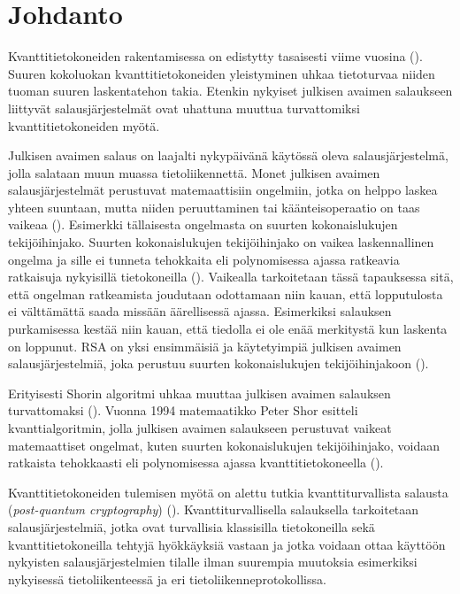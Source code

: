 \chapter{Johdanto\label{intro}}
Kvanttitietokoneiden rakentamisessa on edistytty tasaisesti viime vuosina (\cite{alagic2020status}). Suuren kokoluokan kvanttitietokoneiden yleistyminen uhkaa tietoturvaa niiden tuoman suuren laskentatehon takia. Etenkin nykyiset julkisen avaimen salaukseen liittyvät salausjärjestelmät ovat uhattuna muuttua turvattomiksi kvanttitietokoneiden myötä.

Julkisen avaimen salaus on laajalti nykypäivänä käytössä oleva salausjärjestelmä, jolla salataan muun muassa tietoliikennettä. %
Monet julkisen avaimen salausjärjestelmät perustuvat matemaattisiin ongelmiin, jotka on helppo laskea yhteen suuntaan, mutta niiden peruuttaminen tai käänteisoperaatio on taas vaikeaa (\cite{mavroeidis2018impact}). Esimerkki tällaisesta ongelmasta on suurten kokonaislukujen tekijöihinjako. Suurten kokonaislukujen tekijöihinjako on vaikea laskennallinen ongelma ja sille ei tunneta tehokkaita eli polynomisessa ajassa ratkeavia ratkaisuja nykyisillä tietokoneilla (\cite{doi:10.1137/S0036144598347011}). Vaikealla tarkoitetaan tässä tapauksessa sitä, että ongelman ratkeamista joudutaan odottamaan niin kauan, että lopputulosta ei välttämättä saada missään äärellisessä ajassa. Esimerkiksi salauksen purkamisessa kestää niin kauan, että tiedolla ei ole enää merkitystä kun laskenta on loppunut. %
RSA on yksi ensimmäisiä ja käytetyimpiä julkisen avaimen salausjärjestelmiä, joka perustuu suurten kokonaislukujen tekijöihinjakoon (\cite{montgomery1994survey}).

Erityisesti Shorin algoritmi uhkaa muuttaa julkisen avaimen salauksen turvattomaksi (\cite{mavroeidis2018impact}). Vuonna 1994 matemaatikko Peter Shor esitteli kvanttialgoritmin, jolla julkisen avaimen salaukseen perustuvat vaikeat matemaattiset ongelmat, kuten suurten kokonaislukujen tekijöihinjako, voidaan ratkaista tehokkaasti eli polynomisessa ajassa kvanttitietokoneella (\cite{doi:10.1137/S0036144598347011}).

Kvanttitietokoneiden tulemisen myötä on alettu tutkia kvanttiturvallista salausta (\emph{post-quantum cryptography}) (\cite{alagic2020status}). Kvanttiturvallisella salauksella tarkoitetaan salausjärjestelmiä, jotka ovat turvallisia klassisilla tietokoneilla sekä kvanttitietokoneilla tehtyjä hyökkäyksiä vastaan ja jotka voidaan ottaa käyttöön nykyisten salausjärjestelmien tilalle ilman suurempia muutoksia esimerkiksi nykyisessä tietoliikenteessä ja eri tietoliikenneprotokollissa.


